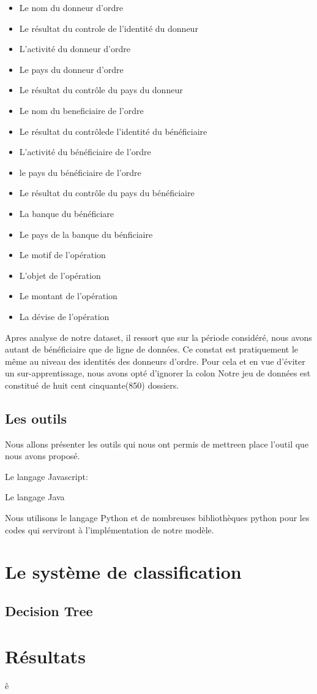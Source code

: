 \begin{itemize}
  \item Le nom du donneur d'ordre
  \item Le résultat du controle de l'identité du donneur
  \item L'activité du donneur d'ordre
  \item Le pays du donneur d'ordre
  \item Le résultat du contrôle du pays du donneur
  \item Le nom du beneficiaire de l'ordre
  \item Le résultat du contrôlede l'identité du bénéficiaire
  \item L'activité du bénéficiaire de l'ordre
  \item le pays du bénéficiaire de l'ordre
  \item Le résultat du contrôle du pays du bénéficiaire
  \item La banque du bénéficiare
  \item Le pays de la banque du bénficiaire
  \item Le motif de l'opération
  \item L'objet de l'opération
  \item Le montant de l'opération
  \item La dévise de l'opération
\end{itemize}
Apres analyse de notre dataset, il ressort que sur la période considéré, nous
avons autant de bénéficiaire que de ligne de données. Ce constat est
pratiquement le même au niveau des identités des donneurs d'ordre. Pour cela et
en vue d'éviter un sur-apprentissage, nous avons opté d'ignorer la colon
Notre jeu de données est constitué de huit cent cinquante(850) dossiers. 

\subsection{Les outils}
Nous allons présenter les outils qui nous ont permis de mettreen place l'outil
que nous avons proposé.

Le langage Javascript: 

Le langage Java

Nous utilisons le langage Python et de nombreuses bibliothèques python pour 
les codes qui serviront à l’implémentation de notre modèle. 

\section{Le système de classification}
  \subsection{Decision Tree}

  \section{Résultats}



ê

